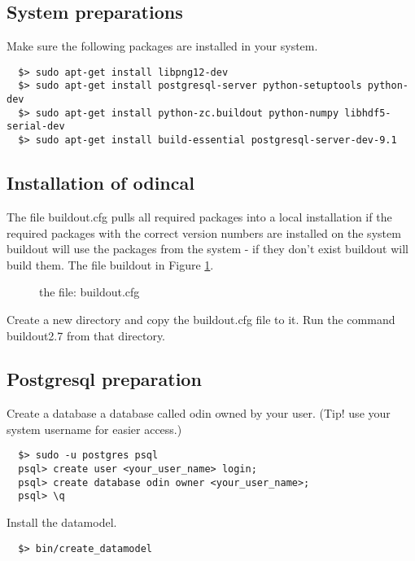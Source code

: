 \subsection{System preparations}
Make sure the following packages are installed in your system.
\begin{verbatim}  
  $> sudo apt-get install libpng12-dev
  $> sudo apt-get install postgresql-server python-setuptools python-dev
  $> sudo apt-get install python-zc.buildout python-numpy libhdf5-serial-dev
  $> sudo apt-get install build-essential postgresql-server-dev-9.1
\end{verbatim}

\subsection{Installation of odincal}

The file buildout.cfg pulls all required packages into a local installation if the required packages with the correct version numbers are installed on the system buildout will use the packages from the system - if they don't exist buildout will build them. The file buildout in Figure \ref{buildout}.

\begin{figure}
\caption{the file: buildout.cfg}
\label{buildout}
\end{figure}

Create a new directory and copy the buildout.cfg file to it. Run the command buildout2.7 from that directory.


\subsection{Postgresql preparation}
Create a database a database called odin owned by your user. (Tip! use your system username for easier access.)
 
\begin{verbatim}  
  $> sudo -u postgres psql
  psql> create user <your_user_name> login;
  psql> create database odin owner <your_user_name>;
  psql> \q
\end{verbatim}

Install the datamodel.

\begin{verbatim}  
  $> bin/create_datamodel
\end{verbatim}


